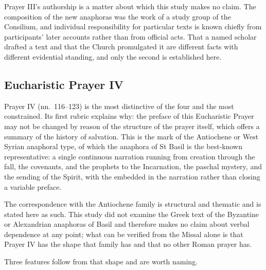 Prayer III's authorship is a matter about which this study makes no claim. The composition of
the new anaphoras was the work of a study group of the Consilium, and individual responsibility
for particular texts is known chiefly from participants' later accounts rather than from
official acts. That a named scholar drafted a text and that the Church promulgated it are
different facts with different evidential standing, and only the second is established here.

\subsection{Eucharistic Prayer IV}

Prayer IV (nn.\ 116--123) is the most distinctive of the four and the most constrained. Its
first rubric explains why: the preface of this Eucharistic Prayer may not be changed by reason
of the structure of the prayer itself, which offers a summary of the history of
salvation. This is the mark of the Antiochene or West
Syrian anaphoral type, of which the anaphora of St Basil is the best-known representative: a
single continuous narration running from creation through the fall, the covenants, and the
prophets to the Incarnation, the paschal mystery, and the sending of the Spirit, with the
 embedded in the narration rather than closing a variable preface.

The correspondence with the Antiochene family is structural and thematic and is stated here as
such. This study did not examine the Greek text of the Byzantine or Alexandrian anaphoras of
Basil and therefore makes no claim about verbal dependence at any point; what can be verified
from the Missal alone is that Prayer IV has the shape that family has and that no other Roman
prayer has.

Three features follow from that shape and are worth naming.

